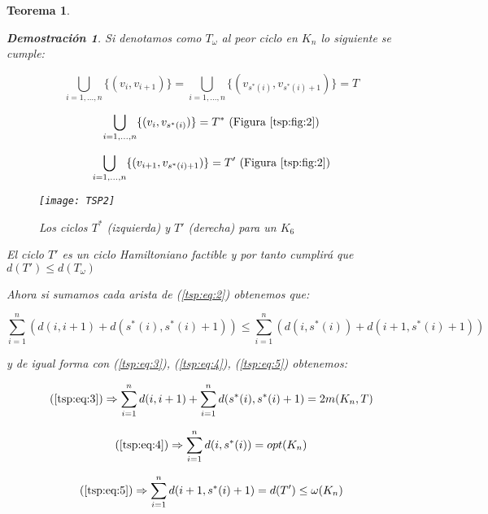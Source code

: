 \documentclass[a4paper,12pt,titlepage]{article}
\newtheorem{teo}{Teorema}[section]
\newtheorem*{dem}{\textbf{Demostraci\'on}}
\begin{document}
\begin{teo}
\begin{dem}
Si denotamos como $T_{\omega}$ al peor ciclo en $K_n$ lo siguiente se cumple:

\begin{equation} \label{tsp:eq:3}
\bigcup\limits_{i=1,...,n}\{(v_i,v_{i+1})\} = \bigcup\limits_{i=1,...,n}\{(v_{s^*(i)},v_{s^*(i)+1})\}=T
\end{equation}

\begin{equation} \label{tsp:eq:4}
\bigcup\limits_{i=1,...,n} \{(v_i, v_{s^*(i)})\} = T^* \text{ (Figura \ref{tsp:fig:2})}
\end{equation}

\begin{equation} \label{tsp:eq:5}
\bigcup\limits_{i=1,...,n} \{(v_{i+1},v_{s^*(i)+1})\} = T' \text{ (Figura \ref{tsp:fig:2})}
\end{equation}

\begin{figure}[h]
\centering
\texttt{[image: TSP2]}
\caption{Los ciclos $T^*$ (izquierda) y $T'$ (derecha) para un $K_6$}
\label{tsp:fig:2}
\end{figure}

El ciclo $T'$ es un ciclo Hamiltoniano factible y por tanto cumplir\'a que $d(T') \leq d(T_{\omega})$

Ahora si sumamos cada arista de (\ref{tsp:eq:2}) obtenemos que:

\begin{equation} \label{tsp:eq:6}
\sum_{i=1}^n \left( d(i,i+1)+d(s^*(i),s^*(i)+1) \right) \leq \sum_{i=1}^n \left(d(i,s^*(i))+d(i+1,s^*(i)+1)\right)
\end{equation}

y de igual forma con (\ref{tsp:eq:3}), (\ref{tsp:eq:4}), (\ref{tsp:eq:5}) obtenemos:

\begin{equation} \label{tsp:eq:7}
(\ref{tsp:eq:3}) \Rightarrow \sum_{i=1}^n d(i,i+1) + \sum_{i=1}^n d(s^*(i), s^*(i)+1) = 2m(K_n,T)
\end{equation}

\begin{equation} \label{tsp:eq:8}
(\ref{tsp:eq:4}) \Rightarrow \sum_{i=1}^n d(i, s^*(i)) = opt(K_n)
\end{equation}

\begin{equation} \label{tsp:eq:9}
(\ref{tsp:eq:5}) \Rightarrow \sum_{i=1}^n d(i+1,s^*(i)+1) = d(T') \leq \omega(K_n)
\end{equation}


\end{dem}
\end{teo}
\end{document}
